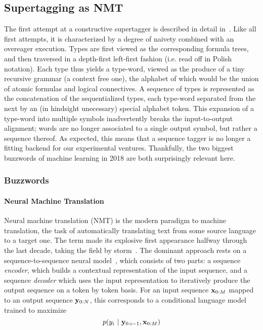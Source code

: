 \subsection{Supertagging as NMT}
\label{subsection:snmt}
The first attempt at a constructive supertagger is described in detail in~\citet{kogkalidis-etal-2019-constructive}.
Like all first attempts, it is characterized by a degree of naivety combined with an overeager execution.
Types are first viewed as the corresponding formula trees, and then traversed in a depth-first left-first fashion (i.e. read off in Polish notation).
Each type thus yields a type-word, viewed as the produce of a tiny recursive grammar (a context free one), the alphabet of which would be the union of atomic formulas and logical connectives.
A sequence of types is represented as the concatenation of the sequentialized types, each type-word separated from the next by an (in hindsight unecessary) special alphabet token.
This expansion of a type-word into multiple symbols inadvertently breaks the input-to-output alignment; words are no longer associated to a single output symbol, but rather a sequence thereof.
As expected, this means that a sequence tagger is no longer a fitting backend for our experimental ventures.
Thankfully, the two biggest buzzwords of machine learning in 2018 are both surprisingly relevant here.

\subsubsection{Buzzwords}
\paragraph{Neural Machine Translation} Neural machine translation (NMT) is the modern paradigm to machine translation, the task of automatically translating text from some source language to a target one.
The term made its explosive first appearance halfway through the last decade, taking the field by storm~\cite{kalchbrenner2013recurrent,cho2014learning,bahdanau2015neural}.
The dominant approach rests on a sequence-to-sequence neural model~\cite{cho2014learning,NIPS2014_a14ac55a}, which consists of two parts: a sequence \textit{encoder}, which builds a contextual representation of the input sequence, and a sequence \textit{decoder} which uses the input representation to iteratively produce the output sequence on a token by token basis.
For an input sequence $\mathbf{x}_{0:M}$ mapped to an output sequence $\mathbf{y}_{0:N}$, this corresponds to a conditional language model trained to maximize
\begin{equation}
	p(y_i \ | \ \seq{y}{0:i-1},\seq{x}{0:M})
\end{equation}

